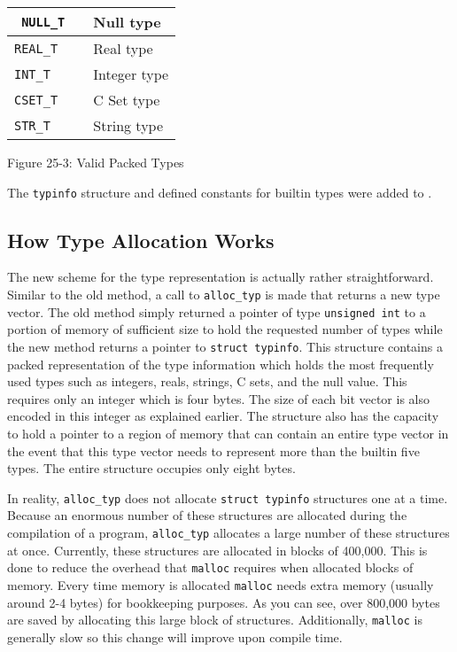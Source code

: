 \begin{center}
\tabletail{}
\tablelasttail{}
\begin{xtabular}{|m{0.6629598in}|m{0.42545983in}|m{0.8122598in}|}
\hline
\texttt{ NULL\_T} &
 &
 Null type\\\hline
 \texttt{REAL\_T} &
 &
 Real type\\\hline
 \texttt{INT\_T} &
 &
 Integer type\\\hline
 \texttt{CSET\_T} &
 &
 C Set type\\\hline
 \texttt{STR\_T} &
 &
 String type\\\hline
\end{xtabular}
\end{center}
{\centering{}
Figure 25-3: Valid Packed Types
\par}

The \texttt{typinfo} structure and defined constants for builtin types
were added to .

\subsection{How Type Allocation Works}

The new scheme for the type representation is actually rather
straightforward. Similar to the old method, a call to
\texttt{alloc\_typ} is made that returns a new type vector. The old
method simply returned a pointer of type \texttt{unsigned int} to a
portion of memory of sufficient size to hold the requested number of
types while the new method returns a pointer to \texttt{struct
typinfo}. This structure contains a packed representation of the type
information which holds the most frequently used types such as
integers, reals, strings, C sets, and the null value. This requires
only an integer which is four bytes. The size of each bit vector is
also encoded in this integer as explained earlier. The structure also
has the capacity to hold a pointer to a region of memory that can
contain an entire type vector in the event that this type vector needs
to represent more than the builtin five types. The entire structure
occupies only eight bytes.

In reality, \texttt{alloc\_typ} does not allocate \texttt{struct
typinfo} structures one at a time. Because an enormous number of these
structures are allocated during the compilation of a program,
\texttt{alloc\_typ} allocates a large number of these structures at
once. Currently, these structures are allocated in blocks of
400,000. This is done to reduce the overhead that \texttt{malloc}
requires when allocated blocks of memory. Every time memory is
allocated \texttt{malloc} needs extra memory (usually around 2-4
bytes) for bookkeeping purposes. As you can see, over 800,000 bytes
are saved by allocating this large block of structures. Additionally,
\texttt{malloc} is generally slow so this change will improve upon
compile time.

